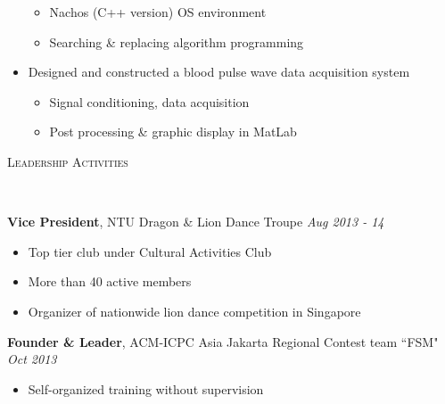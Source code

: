 \documentclass[a4paper, 12pt]{article}
\newenvironment{changemargin}[2]{%
  \begin{list}{}{%
      \setlength{\topsep}{0pt}%
      \setlength{\leftmargin}{#1}%
      \setlength{\rightmargin}{#2}%
      \setlength{\listparindent}{\parindent}%
      \setlength{\itemindent}{\parindent}%
      \setlength{\parsep}{\parskip}%
    }%
  \item[]}{\end{list}
}
\newcommand{\lineover}{
  \begin{changemargin}{-0.05in}{-0.05in}
    \vspace*{-8pt}
    \hrulefill \\
    \vspace*{-2pt}
  \end{changemargin}
}
\newcommand{\header}[1]{
  \begin{changemargin}{-0.5in}{-0.5in}
    \scshape{#1}\\
    \lineover
  \end{changemargin}
}
\newenvironment{body}
{
\vspace*{-16pt}
\begin{changemargin}{-0.25in}{-0.5in}
}	
{
\end{changemargin}
}
\begin{document}
\begin{body}
\begin{itemize}
    \begin{itemize} \itemsep -0pt \small
        \item Nachos (C++ version) OS environment
        \item Searching \& replacing algorithm programming
    \end{itemize}
  \item Designed and constructed a blood pulse wave data acquisition system
    \begin{itemize} \itemsep -0pt \small
        \item Signal conditioning, data acquisition
        \item Post processing \& graphic display in MatLab
    \end{itemize}
  \end{itemize}
\end{body}


\smallskip
\medskip
\header{Leadership Activities}
\begin{body}
  \vspace{14pt}
  \textbf{Vice President}, NTU Dragon \& Lion Dance Troupe \hfill {} \emph{Aug 2013 - 14}\\
  \begin{itemize} \itemsep -0pt \small
        \item Top tier club under Cultural Activities Club
        \item More than 40 active members
        \item Organizer of nationwide lion dance competition in Singapore
  \end{itemize}
  \smallskip
  \textbf{Founder \& Leader}, ACM-ICPC Asia Jakarta Regional Contest team ``FSM" \hfill {} \emph{Oct 2013}\\
  \begin{itemize} \itemsep -0pt \small
        \item Self-organized training without supervision
  \end{itemize}
\end{body}

%
%
\end{document}
